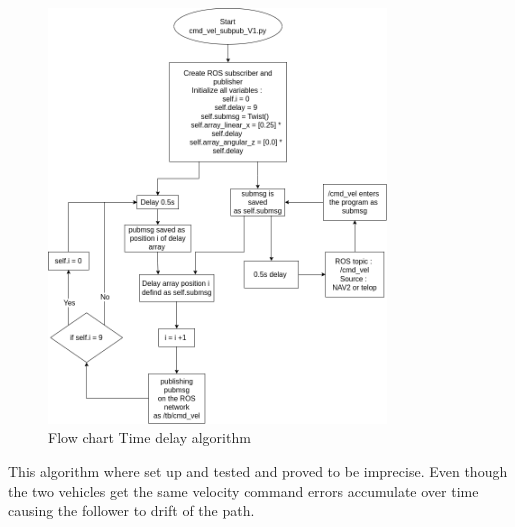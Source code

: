 \begin{figure}[H]
    \centering
    \includegraphics[width = 0.8\textwidth]{Figures/drawio/cmd_vel_subpub.png}
    \caption{Flow chart Time delay algorithm}
    \label{fig:TimeDelayFlow}
\end{figure}
This algorithm where set up and tested and proved to be imprecise. Even though the two vehicles get the same velocity command errors accumulate over time causing the follower to drift of the path. 



